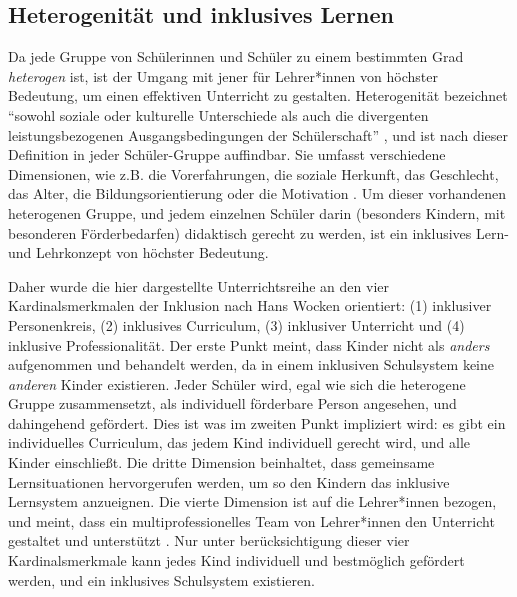 \documentclass[12pt]{article}
\begin{document}
\subsection{Heterogenität und inklusives Lernen}
Da jede Gruppe von Schülerinnen und Schüler zu einem bestimmten Grad \textit{heterogen} ist, ist der Umgang mit jener für Lehrer*innen von höchster Bedeutung, um einen effektiven Unterricht zu gestalten. Heterogenität bezeichnet \enquote{sowohl soziale oder kulturelle
Unterschiede als auch die divergenten leistungsbezogenen
Ausgangsbedingungen der Schülerschaft} \autocite[87]{grohlich_wirkt_2009}, und ist nach dieser Definition in jeder Schüler-Gruppe auffindbar. Sie umfasst verschiedene Dimensionen, wie z.B. die Vorerfahrungen, die soziale Herkunft, das Geschlecht, das Alter, die Bildungsorientierung oder die Motivation \autocite[vgl.][]{trautmann_heterogenitat_2011}. Um dieser vorhandenen heterogenen Gruppe, und jedem einzelnen Schüler darin (besonders Kindern, mit besonderen Förderbedarfen) didaktisch gerecht zu werden, ist ein inklusives Lern- und Lehrkonzept von höchster Bedeutung.

Daher wurde die hier dargestellte Unterrichtsreihe an den vier Kardinalsmerkmalen der Inklusion nach Hans Wocken orientiert: (1) inklusiver Personenkreis, (2) inklusives Curriculum, (3) inklusiver Unterricht und (4) inklusive Professionalität. Der erste Punkt meint, dass Kinder nicht als \textit{anders} aufgenommen und behandelt werden, da in einem inklusiven Schulsystem keine \textit{anderen} Kinder existieren. Jeder Schüler wird, egal wie sich die heterogene Gruppe zusammensetzt, als individuell förderbare Person angesehen, und dahingehend gefördert. Dies ist was im zweiten Punkt impliziert wird: es gibt ein individuelles Curriculum, das jedem Kind individuell gerecht wird, und alle Kinder einschließt. Die dritte Dimension beinhaltet, dass gemeinsame Lernsituationen hervorgerufen werden, um so den Kindern das inklusive Lernsystem anzueignen. Die vierte Dimension ist auf die Lehrer*innen bezogen, und meint, dass ein multiprofessionelles Team von Lehrer*innen den Unterricht gestaltet und unterstützt \autocite[vgl.][S.4f.]{wocken_inklusive_2019}. Nur unter berücksichtigung dieser vier Kardinalsmerkmale kann jedes Kind individuell und bestmöglich gefördert werden, und ein inklusives Schulsystem existieren.
\end{document}
